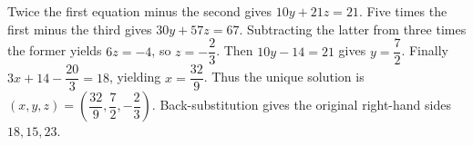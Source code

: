 Twice the first equation minus the second gives $10y+21z=21$. Five times the first minus the third gives $30y+57z=67$. Subtracting the latter from three times the former yields $6z=-4$, so $z=-\dfrac{2}{3}$. Then $10y-14=21$ gives $y=\dfrac{7}{2}$. Finally $3x+14-\dfrac{20}{3}=18$, yielding $x=\dfrac{32}{9}$. Thus the unique solution is $\boxed{(x,y,z)=(\dfrac{32}{9},\dfrac{7}{2},-\dfrac{2}{3})}$. Back-substitution gives the original right-hand sides $18,15,23$.
